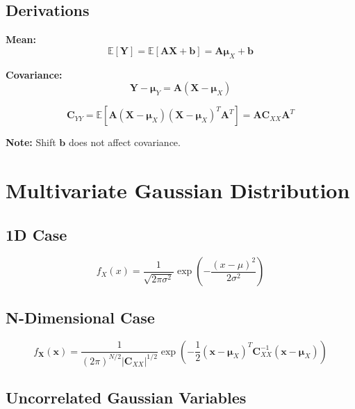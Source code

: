 \documentclass[11pt]{article}
\begin{document}
\subsection{Derivations}

\textbf{Mean:}
\begin{equation}
\mathbb{E}[\mathbf{Y}] = \mathbb{E}[\mathbf{A}\mathbf{X} + \mathbf{b}] = \mathbf{A}\boldsymbol{\mu}_X + \mathbf{b}
\end{equation}

\textbf{Covariance:}
\begin{equation}
\mathbf{Y} - \boldsymbol{\mu}_Y = \mathbf{A}(\mathbf{X} - \boldsymbol{\mu}_X)
\end{equation}

\begin{equation}
\mathbf{C}_{YY} = \mathbb{E}[\mathbf{A}(\mathbf{X} - \boldsymbol{\mu}_X)(\mathbf{X} - \boldsymbol{\mu}_X)^T \mathbf{A}^T]
= \mathbf{A}\mathbf{C}_{XX}\mathbf{A}^T
\end{equation}

\textbf{Note:} Shift $\mathbf{b}$ does not affect covariance.

\section{Multivariate Gaussian Distribution}

\subsection{1D Case}
\begin{equation}
f_X(x) = \frac{1}{\sqrt{2\pi\sigma^2}} \exp\left(-\frac{(x-\mu)^2}{2\sigma^2}\right)
\end{equation}

\subsection{N-Dimensional Case}
\begin{equation}
f_{\mathbf{X}}(\mathbf{x}) =
\frac{1}{(2\pi)^{N/2} |\mathbf{C}_{XX}|^{1/2}}
\exp\left(-\frac{1}{2}(\mathbf{x}-\boldsymbol{\mu}_X)^T \mathbf{C}_{XX}^{-1} (\mathbf{x}-\boldsymbol{\mu}_X)\right)
\end{equation}

\subsection{Uncorrelated Gaussian Variables}
\end{document}
